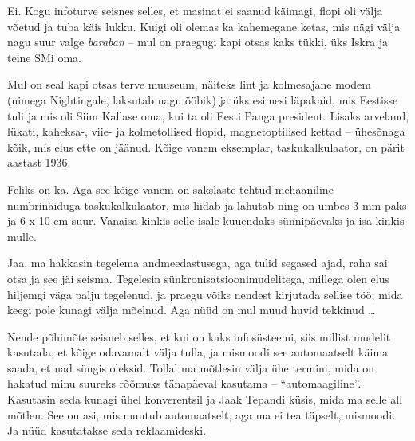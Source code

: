 
Ei. Kogu infoturve seisnes selles, et masinat ei saanud käimagi, flopi oli välja 
võetud ja tuba käis lukku. Kuigi oli olemas ka kahemegane ketas, mis nägi välja nagu
suur valge \emph{baraban} -- mul on praegugi kapi otsas kaks tükki, üks 
Iskra ja teine SMi oma.

Mul on seal kapi otsas terve muuseum, näiteks lint ja kolmesajane 
modem (nimega Nightingale, laksutab nagu ööbik) ja üks 
esimesi läpakaid, mis Eestisse tuli ja mis oli Siim Kallase oma, 
kui ta oli Eesti Panga president. Lisaks arvelaud, lükati, kaheksa-, viie- ja kolmetollised 
flopid, magnetoptilised kettad -- 
ühesõnaga kõik, mis elus ette on jäänud. Kõige vanem eksemplar, taskukalkulaator, on pärit 
aastast 1936.


Feliks on ka. Aga see kõige vanem on sakslaste tehtud mehaaniline numbrinäiduga taskukalkulaator, mis liidab ja 
lahutab ning on umbes 3 mm paks ja 6 x 10 cm suur. Vanaisa kinkis selle isale kuuendaks 
sünnipäevaks ja isa kinkis mulle. 


Jaa, ma hakkasin tegelema andmeedastusega, aga tulid segased ajad, raha sai 
otsa ja see jäi seisma. Tegelesin sünkronisatsioonimudelitega, millega olen 
elus hiljemgi väga palju tegelenud, ja praegu võiks nendest kirjutada sellise
töö, mida keegi pole kunagi välja mõelnud. Aga nüüd on mul muud huvid tekkinud \ldots 


Nende põhimõte seisneb selles, et kui on kaks infosüsteemi, siis millist mudelit 
kasutada, et kõige odavamalt välja tulla, ja mismoodi see automaatselt käima 
saada, et nad süngis oleksid. Tollal ma mõtlesin välja ühe termini, mida on hakatud minu suureks rõõmuks tänapäeval kasutama -- 
\enquote{automaagiline}. Kasutasin seda kunagi ühel konverentsil ja Jaak Tepandi küsis, mida ma selle all mõtlen. See on asi, mis muutub automaatselt, aga ma ei 
tea täpselt, mismoodi. Ja nüüd kasutatakse seda reklaamideski. 

